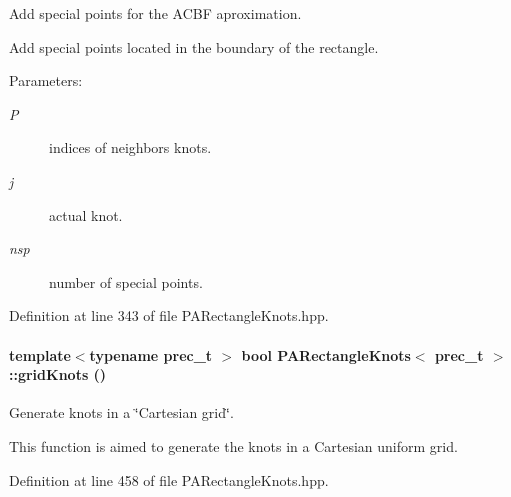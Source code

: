 Add special points for the ACBF aproximation. 

Add special points located in the boundary of the rectangle.

\begin{Desc}
\item[Parameters:]
\begin{description}
\item[{\em P}]indices of neighbors knots. \item[{\em j}]actual knot. \item[{\em nsp}]number of special points. \end{description}
\end{Desc}


Definition at line 343 of file PARectangleKnots.hpp.\hypertarget{classPARectangleKnots_06a385116f58ff16cbf0fc91211f5e05}{
\paragraph[{gridKnots}]{\setlength{\rightskip}{0pt plus 5cm}template$<$typename prec\_\-t $>$ bool {\bf PARectangleKnots}$<$ prec\_\-t $>$::gridKnots ()}\hfill}
\label{classPARectangleKnots_06a385116f58ff16cbf0fc91211f5e05}


Generate knots in a \char`\"{}Cartesian grid\char`\"{}. 

This function is aimed to generate the knots in a Cartesian uniform grid. 

Definition at line 458 of file PARectangleKnots.hpp.